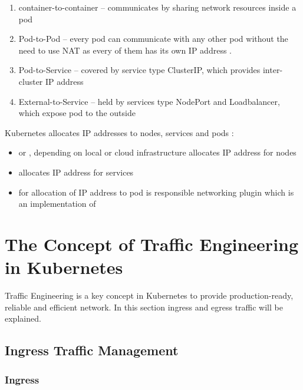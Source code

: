 \begin{enumerate}
    \item container-to-container -- communicates by sharing network resources inside a pod
    \item Pod-to-Pod -- every pod can communicate with any other pod without the need to use NAT as every of them has its own IP address \cite{IBMKubernetesNetworking}.
    \item Pod-to-Service -- covered by service type ClusterIP, which provides inter-cluster IP address
    \item External-to-Service -- held by services type NodePort and Loadbalancer, which expose pod to the outside
\end{enumerate}
Kubernetes allocates IP addresses to nodes, services and pods \cite{KubernetesClusterNetworking}:
\begin{itemize}
    \item \textit{} or \textit{}, depending on local or cloud infrastructure allocates IP address for nodes
    \item \textit{} allocates IP address for services
    \item for allocation of IP address to pod is responsible networking plugin which is an implementation of \textit{}
\end{itemize}



\section{The Concept of Traffic Engineering in Kubernetes}
\label{sec:trafficConcept}

Traffic Engineering is a key concept in Kubernetes to provide production-ready, reliable and efficient network. In this section ingress and egress traffic will be explained.


\subsection{Ingress Traffic Management}
\label{sec:ingressTrafficMngmnt}

\subsubsection{Ingress}
\label{ingress}

